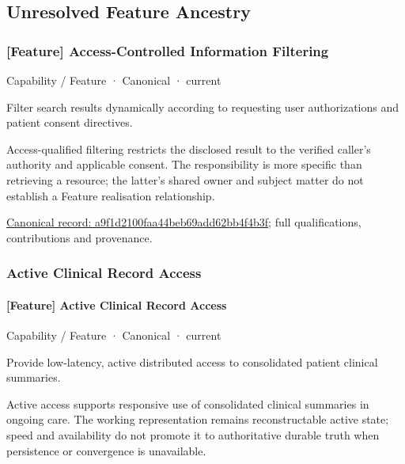 \subsection{Unresolved Feature Ancestry}

\subsubsection{[Feature] Access-Controlled Information Filtering}

\label{element:a9f1d2100faa44beb69add62bb4f4b3f}
{\small Capability / Feature · Canonical · current}\par

Filter search results dynamically according to requesting user authorizations and patient consent directives.



Access-qualified filtering restricts the disclosed result to the verified caller's authority and applicable consent. The responsibility is more specific than retrieving a resource; the latter's shared owner and subject matter do not establish a Feature realisation relationship.


{\footnotesize \href{../../../../continuum/strategy/capability/feature/a9f1d2100faa44beb69add62bb4f4b3f.md}{Canonical record: a9f1d2100faa44beb69add62bb4f4b3f}; full qualifications, contributions and provenance.}\par
\subsubsection{Active Clinical Record Access}

\paragraph{[Feature] Active Clinical Record Access}

\label{element:76b35ecac42b4781bfd7911c9931f5f1}
{\small Capability / Feature · Canonical · current}\par

Provide low-latency, active distributed access to consolidated patient clinical summaries.



Active access supports responsive use of consolidated clinical summaries in ongoing care. The working representation remains reconstructable active state; speed and availability do not promote it to authoritative durable truth when persistence or convergence is unavailable.


